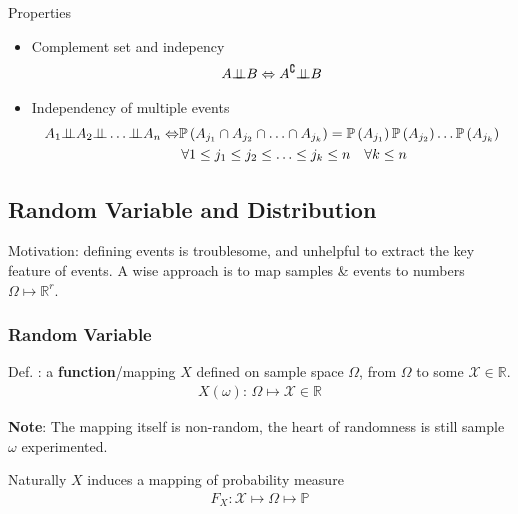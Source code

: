     Properties
    \begin{itemize}[topsep=2pt,itemsep=0pt]
        \item Complement set and indepency
        \begin{align}
            A\bot\!\!\!\bot B\Leftrightarrow A^\complement \bot\!\!\!\bot B 
        \end{align}
        \item Independency of multiple events
        \begin{align}
            A_1\independent A_2\independent\ldots \independent A_n \Leftrightarrow &\mathbb{P}\left( A_{j_1}\cap A_{j_2}\cap\ldots\cap A_{j_k} \right)=\mathbb{P}\left( A_{j_1} \right) \mathbb{P}\left( A_{j_2} \right) \ldots \mathbb{P}\left( A_{j_k} \right) \\
            &  \,\forall 1\leq j_1\leq j_2\leq \ldots \leq j_k\leq n\quad \forall k\leq n
        \end{align}
    \end{itemize}
    
        

\subsection{Random Variable and Distribution}\label{SectionPropertiesOfRandomVariableAndVector}

Motivation: defining events is troublesome, and unhelpful to extract the key feature of events. A wise approach is to map samples \& events to numbers $ \Omega \mapsto \mathbb{R}^r $.

\subsubsection{Random Variable}
    Def. : a \textbf{function}/mapping $X$ defined on sample space $\Omega$,  from $\Omega$ to some $\mathscr{X}\in\mathbb{R} $.
    \begin{align}
        X(\omega ):\, \Omega \mapsto \mathscr{X}\in\mathbb{R} 
    \end{align}

    \textbf{Note}: The mapping itself is non-random, the heart of randomness is still sample $ \omega  $ experimented. 

    Naturally $ X $ induces a mapping of probability measure
    \begin{align}
        F_X: \mathscr{X} \mapsto \Omega \mapsto \mathbb{P} 
    \end{align}

